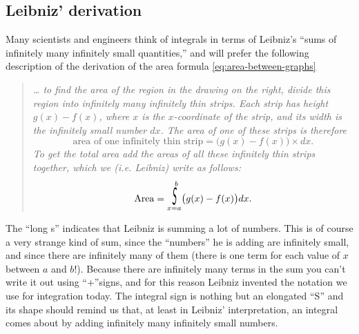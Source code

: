 \subsection{Leibniz' derivation} %
Many scientists and engineers think of integrals in terms of Leibniz's ``sums of
infinitely many infinitely small quantities,'' and will prefer the following
description of the derivation of the area formula \eqref{eq:area-between-graphs} 
\begin{quotation}
  \small\itshape \ldots
  to find the area of the region in the drawing on the right,
  divide this region into infinitely many infinitely
  thin strips.  Each strip has height $g(x) - f(x)$, where $x$ is the
  $x$-coordinate of the strip, and its width is the infinitely small number $dx$.
  \marginpar{ \footnotesize\sffamily\itshape%
   } The area of one of
  these strips is therefore
  \[
    \text{area of one infinitely thin strip} = \bigl(g(x) - f(x)\bigr) \times dx.
  \]
  To get the total area add the areas of all these infinitely
  thin strips together, which we (i.e. Leibniz) write as follows:
  \[
    \text{Area} =
    \mathop{\raisebox{-3pt}{\scalebox{0.8}[2.5]{\slshape\sffamily S}}}
    _{x=a}^{\;\;b} \bigl(g(x) - f(x)\bigr) dx.
  \]
\end{quotation}
The ``long s'' indicates that Leibniz is summing a lot of numbers.  This is
of course a very strange kind of sum, since the ``numbers'' he is adding are
infinitely small, and since there are infinitely many of them (there is one term
for each value of $x$ between $a$ and $b$!). Because there are infinitely many
terms in the sum you can't write it out using ``$+$''signs, and for this reason
Leibniz invented the notation we use for integration today.  The integral sign
is nothing but an elongated ``S'' and its shape should remind us that, at least
in Leibniz' interpretation, an integral comes about by adding infinitely many
infinitely small numbers.


